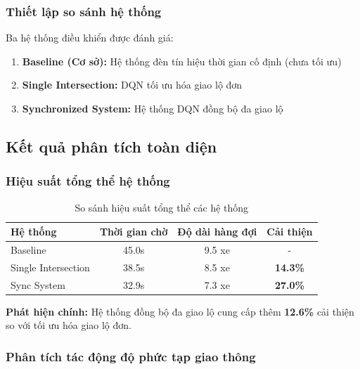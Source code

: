 \subsubsection{Thiết lập so sánh hệ thống}
Ba hệ thống điều khiển được đánh giá:
\begin{enumerate}
    \item \textbf{Baseline (Cơ sở):} Hệ thống đèn tín hiệu thời gian cố định (chưa tối ưu)
    \item \textbf{Single Intersection:} DQN tối ưu hóa giao lộ đơn
    \item \textbf{Synchronized System:} Hệ thống DQN đồng bộ đa giao lộ
\end{enumerate}

\subsection{Kết quả phân tích toàn diện}

\subsubsection{Hiệu suất tổng thể hệ thống}

\begin{table}[!htp]
    \centering
    \caption{So sánh hiệu suất tổng thể các hệ thống}
    \label{tab:overall_system_performance}
    \begin{tabular}{@{}lccc@{}}
        \toprule 
        \textbf{Hệ thống} & \textbf{Thời gian chờ} & \textbf{Độ dài hàng đợi} & \textbf{Cải thiện} \\
        \midrule 
        Baseline & 45.0s & 9.5 xe & - \\
        Single Intersection & 38.5s & 8.5 xe & \textbf{14.3\%} \\
        Sync System & 32.9s & 7.3 xe & \textbf{27.0\%} \\
        \bottomrule
    \end{tabular}
\end{table}

\textbf{Phát hiện chính:} Hệ thống đồng bộ đa giao lộ cung cấp thêm \textbf{12.6\%} 
cải thiện so với tối ưu hóa giao lộ đơn.

\subsubsection{Phân tích tác động độ phức tạp giao thông}

